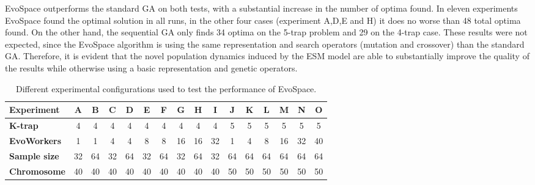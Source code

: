 EvoSpace outperforms the standard GA on both tests, with a substantial increase in the number of optima found.
In eleven experiments EvoSpace found the optimal solution in all runs, in the other four cases (experiment A,D,E and H) it does no worse than
48 total optima found.
On the other hand, the sequential GA only finds 34 optima on the 5-trap problem and 29 on the 4-trap case.
These results were not expected, since the EvoSpace algorithm is using the same representation and search operators (mutation and crossover) than the standard
GA. Therefore, it is evident that the novel population dynamics induced by the ESM model are able to substantially improve the quality of the results
while otherwise using a basic representation and genetic operators.

\begin{table}[t]
\caption{Different experimental configurations used to test the
  performance of EvoSpace.} %
\centering
\scriptsize
\begin{tabular}{|l||c|c|c|c|c|c|c|c|c|c|c|c|c|c|c|}
   \hline
             \textbf{Experiment} 	& A & B & C & D & E & F & G & H & I & J & K & L & M & N & O \\

   \hline
               \textbf{K-trap}   	& 4  & 4  & 4  & 4  & 4  & 4  & 4  & 4  & 4 & 5 & 5 & 5 & 5 & 5 & 5 \\
			   \textbf{EvoWorkers}  & 1  & 1  & 4  & 4  & 8  & 8  & 16 & 16 & 32 & 1 & 4 & 8 & 16 & 32 & 40 \\
			   \textbf{Sample size} & 32 & 64 & 32 & 64 & 32 & 64 & 32 & 64 & 32 & 64 & 64 & 64 & 64 & 64 & 64 \\
			   \textbf{Chromosome} & 40 & 40 & 40 & 40 & 40 & 40 & 40 & 40 & 40 & 50 & 50 & 50 & 50 & 50 & 50 \\
   \hline
\end{tabular}
\label{tab:exp}
\end{table}


%
%


